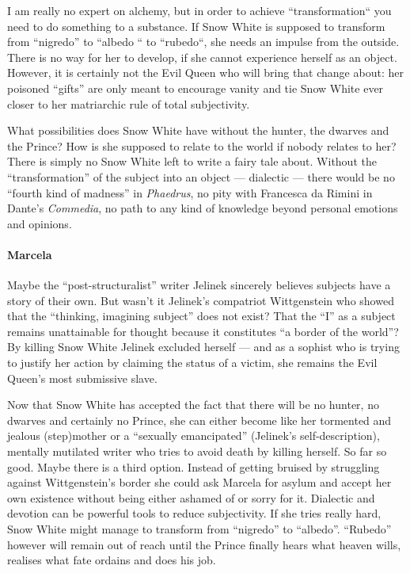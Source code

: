 I am really no expert on alchemy, but in order to achieve “transformation“ you need to do something to a substance. If Snow White is supposed to transform from “nigredo” to “albedo “ to “rubedo“, she needs an impulse from the outside. There is no way for her to develop, if she cannot experience herself as an object. However, it is certainly not the Evil Queen who will bring that change about: her poisoned “gifts” are only meant to encourage vanity and tie Snow White ever closer to her matriarchic rule of total subjectivity.

What possibilities does Snow White have without the hunter, the dwarves and the Prince? How is she supposed to relate to the world if nobody relates to her? There is simply no Snow White left to write a fairy tale about. Without the “transformation” of the subject into an object — dialectic — there would be no “fourth kind of madness” in \emph{Phaedrus}, no pity with Francesca da Rimini in Dante's \emph{Commedia}, no path to any kind of knowledge beyond personal emotions and opinions.

\paragraph{Marcela}
Maybe the “post-structuralist” writer Jelinek sincerely believes subjects have a story of their own. But wasn't it Jelinek's compatriot Wittgenstein who showed that the “thinking, imagining subject” does not exist? That the “I” as a subject remains unattainable for thought because it constitutes “a border of the world”? By killing Snow White Jelinek excluded herself — and as a sophist who is trying to justify her action by claiming the status of a victim, she remains the Evil Queen's most submissive slave.

Now that Snow White has accepted the fact that there will be no hunter, no dwarves and certainly no Prince, she can either become like her tormented and jealous (step)mother or a “sexually emancipated” (Jelinek's self-description), mentally mutilated writer who tries to avoid death by killing herself. So far so good. Maybe there is a third option. Instead of getting bruised by struggling against Wittgenstein's border she could ask Marcela for asylum and accept her own existence without being either ashamed of or sorry for it. Dialectic and devotion can be powerful tools to reduce subjectivity. If she tries really hard, Snow White might manage to transform from “nigredo” to “albedo”. “Rubedo” however will remain out of reach until the Prince finally hears what heaven wills, realises what fate ordains and does his job.

